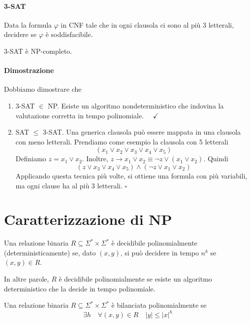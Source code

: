 \paragraph{3-SAT} Data la formula $\varphi$ in CNF tale che in ogni clausola ci sono al più 3 letterali, decidere se $\varphi$ è soddisfacibile. 

\begin{theorem}
    3-SAT è NP-completo.
\end{theorem}
\paragraph{Dimostrazione} Dobbiamo dimostrare che 
\begin{enumerate}
    \item 3-SAT $\in$ NP. Esiste un algoritmo nondeterministico che indovina la valutazione corretta in tempo polinomiale. $\quad \checkmark$
    \item SAT $\leq$ 3-SAT. Una generica clausola può essere mappata in una clausola con meno letterali. Prendiamo come esempio la clausola con 5 letterali 
    $$
        (x_1 \lor x_2 \lor x_3 \lor x_4 \lor x_5)
    $$
    Definiamo $z=x_1\lor x_2$. Inoltre, $z\to x_1\lor x_2\equiv \lnot z\lor(x_1\lor x_2)$. Quindi
    $$
        (z \lor x_3 \lor x_4 \lor x_5) \land (\lnot z \lor x_1 \lor x_2)
    $$
    Applicando questa tecnica più volte, si ottiene una formula con più variabili, ma ogni clause ha al più 3 letterali. \hfill$\square$
\end{enumerate}


\section{Caratterizzazione di NP}

\begin{definition}
    Una relazione binaria $R\subseteq\Sigma^*\times\Sigma^*$ è decidibile polinomialmente (deterministicamente) se, dato $(x,y)$, si può decidere in tempo $n^k$ se $(x,y)\in R$.
\end{definition}
In altre parole, $R$ è decidibile polinomialmente se esiste un algoritmo deterministico che la decide in tempo polinomiale.
\begin{definition}
    Una relazione binaria $R\subseteq\Sigma^*\times\Sigma^*$ è bilanciata polinomialmente se 
    $$
        \exists h \quad \forall(x,y)\in R \quad |y|\leq |x|^h
    $$
\end{definition}

